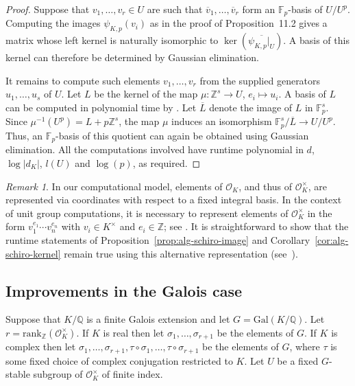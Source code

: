 \documentclass[12pt, a4paper, usenames]{amsart}
\newcommand{\Z}{\mathbb{Z}}
\newcommand{\Q}{\mathbb{Q}}
\newcommand{\F}{\mathbb{F}}
\theoremstyle{plain}
\theoremstyle{remark}
\newtheorem{remark}[theorem]{Remark}
\theoremstyle{definition}
\newcommand{\Gal}{\mathrm{Gal}}
\newcommand{\rank}{\mathrm{rank}}
\begin{document}
\begin{proof}
Suppose that $v_1,\dotsc,v_r\in U$ are such that
$\overline{v}_1,\dotsc,\overline{v}_r$ form an $\mathbb{F}_p$-basis
of $U/U^p$. Computing the images $\psi_{K,p}(v_i)$ as in the proof of
Proposition~11.2 gives a matrix whose left kernel is naturally
isomorphic to
  $\ker(\overline{\psi_{K,p}|_U})$.
A basis of this kernel can therefore be determined by Gaussian
elimination.

It remains to compute such elements $v_1,\dotsc,v_r$ from the supplied
generators $u_1,\dotsc,u_s$ of $U$.
Let $L$ be the kernel of the map $\mu \colon \Z^s \to U$, $e_i \mapsto u_i$.
A basis of $L$ can be computed in polynomial time by
\cite[Theorem~1.2]{ge}. Let $\overline{L}$ denote the image of $L$
in $\mathbb{F}_p^s$. Since
  $\mu^{-1}(U^p)=L+p\mathbb{Z}^s$,
the map $\mu$ induces an isomorphism
  $\mathbb{F}_p^s/\overline{L} \rightarrow U/U^p$.
Thus, an $\F_p$-basis of this quotient can again be obtained using Gaussian elimination.
All the computations involved have
runtime polynomial in
$d$, $\log|d_K|$, $l(U)$ and $\log(p)$, as required.
\end{proof}

\begin{remark}
In our computational model, elements of $\mathcal{O}_K$, and thus of $\mathcal{O}_K^\times$, are represented via coordinates with respect to a fixed integral basis. In the context of unit group computations, it is necessary to represent elements of $\mathcal{O}_K^\times$ in the form $v_1^{e_1} \dotsm v_n^{e_n}$ with $v_i \in K^\times$ and $e_i \in \Z$; see \cite[\S 5.4]{MR3207410}. It is straightforward to show that the runtime statements of Proposition~\ref{prop:alg-schiro-image} and Corollary~\ref{cor:alg-schiro-kernel} remain true using this alternative representation (see~\cite[Remark~4.19]{MR4440537}).
\end{remark}

\subsection{Improvements in the Galois case}\label{subsec:Schirokauer-improvement-Galois}
Suppose that $K/\Q$ is a finite Galois extension and let $G=\Gal(K/\Q)$.
Let $r=\rank_{\Z}(\mathcal{O}_{K}^{\times})$.
If $K$ is real then let $\sigma_{1}, \ldots, \sigma_{r+1}$ be the elements of $G$. 
If $K$ is complex then let 
$\sigma_{1}, \ldots, \sigma_{r+1}, \tau \circ \sigma_{1}, \ldots, 
\tau \circ \sigma_{r+1}$ be the elements of $G$, where $\tau$ is some fixed
choice of complex conjugation restricted to $K$. 
Let $U$ be a fixed $G$-stable subgroup of $\mathcal{O}_{K}^{\times}$ of finite index.
\end{document}
